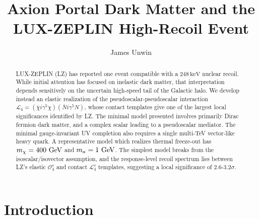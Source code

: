\documentclass[notitlepage,floats,aps,nofootinbib,preprintnumbers,twocolumn,prl,10pt,balancelastpage]{revtex4-1}
\newcommand{\Lag}{\mathcal L}
\newcommand{\Ocal}{\mathcal O}
\begin{document}
\title{Axion Portal Dark Matter and the LUX-ZEPLIN High-Recoil  Event}

\author{James Unwin}

\begin{abstract}
 LUX-ZEPLIN (LZ)  has reported one event compatible with a
$248\,\mathrm{keV}$ nuclear recoil.
While initial attention has focused on inelastic dark matter, that
interpretation depends sensitively on the uncertain high-speed tail of the
Galactic halo.  We develop instead an elastic realization of the
pseudoscalar-pseudoscalar interaction
$\Lag_4=(\bar\chi i\gamma^5\chi)(\bar N i\gamma^5N)$, whose contact templates
give one of the largest local significances identified by LZ.  The minimal model presented involves primarily Dirac fermion dark matter, and a complex scalar leading to a pseudoscalar mediator. The minimal gauge-invariant UV completion also requires a single multi-TeV vector-like heavy quark.
 A representative model which realizes thermal freeze-out has 
$m_\chi=400~{\rm GeV}$ and $m_a=1~{\rm GeV}$. The simplest model breaks from the isoscalar/isovector assumption, and the response-level recoil spectrum lies
between LZ's elastic $\Ocal_4^v$ and contact $\Lag_4^v$ templates, suggesting
a local significance of $2.6$-$3.2\sigma$.
\end{abstract}
\maketitle




\section{Introduction} 

\vspace{-3mm}
\end{document}
